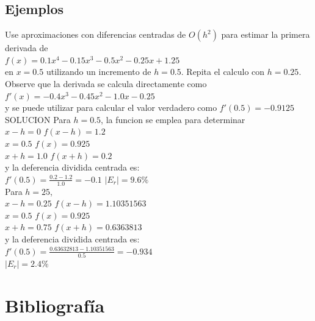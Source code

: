 \documentclass[journal,transmag]{IEEEtran}
\theoremstyle{mytheoremstyle}
\theoremstyle{mytheoremstyle}
\theoremstyle{myproblemstyle}
\begin{document}
\subsection{Ejemplos}
Use aproximaciones con diferencias centradas de $O(h^2)$ para estimar la primera derivada de\\

$f(x)=0.1x^4-0.15x^3-0.5x^2-0.25x+1.25$\\

en $x=0.5$ utilizando un incremento de $h=0.5$. Repita el calculo con $h=0.25$. Observe que la derivada se calcula directamente como\\

$f'(x)=-0.4x^3-0.45x^2-1.0x-0.25$\\

y se puede utilizar para calcular el valor verdadero como $f'(0.5)=-0.9125$\\

SOLUCION Para $h=0.5$, la funcion se emplea para determinar\\
$x-h=0$        \hspace{5em}             $f(x-h)=1.2$\\
$x=0.5$        \hspace{6em}             $f(x)=0.925$\\
$x+h=1.0$   \hspace{5em}                $f(x+h)=0.2$\\

y la deferencia dividida centrada es:\\

$f'(0.5)=\frac{0.2-1.2}{1.0}=-0.1$ \hspace{2em} $|E_r|=9.6\%$ \\

Para $h=25$,\\

$x-h=0.25$        \hspace{3em}             $f(x-h)=1.10351563$\\
$x=0.5$        \hspace{3em}             $f(x)=0.925$\\
$x+h=0.75$   \hspace{3em}                $f(x+h)=0.6363813$\\

y la deferencia dividida centrada es:\\

$f'(0.5)=\frac{0.63632813-1.10351563}{0.5}=-0.934$\\
$|E_r|=2.4\%$
\newpage
\section{Bibliografía}


\end{document}
